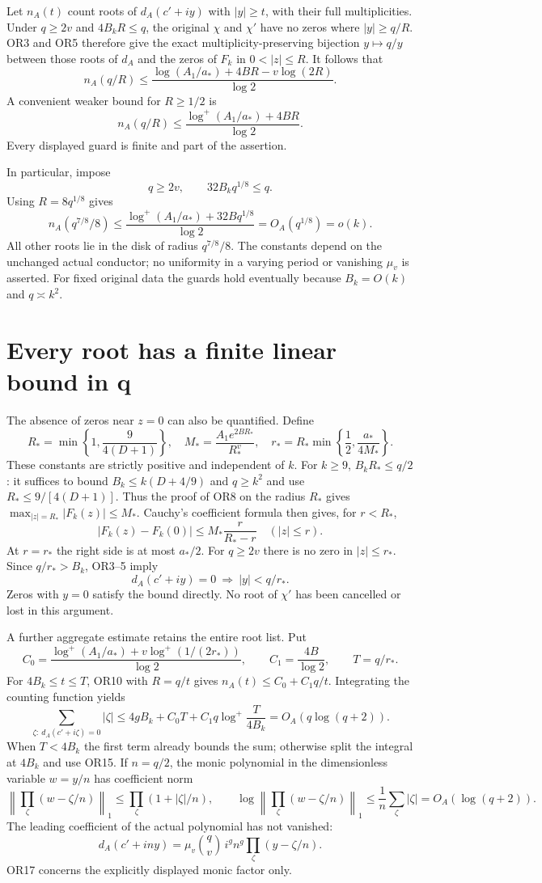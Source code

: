 \documentclass[11pt]{article}
\providecommand{\lp}{\log^+}\providecommand{\norm}[1]{\lVert#1\rVert}
\begin{document}
Let $n_A(t)$ count roots of $d_A(c'+iy)$ with $|y|\ge t$,
with their full multiplicities. Under $q\ge2v$ and $4B_kR\le q$,
the original $\chi$ and $\chi'$ have no zeros where $|y|\ge q/R$.
OR3 and OR5 therefore give the exact multiplicity-preserving
bijection $y\mapsto q/y$ between those roots of $d_A$ and the
zeros of $F_k$ in $0<|z|\le R$. It follows that
\[
n_A(q/R)\le
\frac{\log(A_1/a_*)+4BR-v\log(2R)}{\log2}.
\tag{OR10}
\]
A convenient weaker bound for $R\ge1/2$ is
\[
n_A(q/R)\le
\frac{\lp(A_1/a_*)+4BR}{\log2}.
\tag{OR11}
\]
Every displayed guard is finite and part of the assertion.

In particular, impose
\[
q\ge2v,\qquad 32B_kq^{1/8}\le q.
\tag{OR12}
\]
Using $R=8q^{1/8}$ gives
\[
\boxed{n_A(q^{7/8}/8)\le
\frac{\lp(A_1/a_*)+32Bq^{1/8}}{\log2}
=O_A(q^{1/8})=o(k).}
\tag{OR13}
\]
All other roots lie in the disk of radius $q^{7/8}/8$.
The constants depend on the unchanged actual conductor; no
uniformity in a varying period or vanishing $\mu_v$ is asserted.
For fixed original data the guards hold eventually because
$B_k=O(k)$ and $q\asymp k^2$.

\section{Every root has a finite linear bound in q}
The absence of zeros near $z=0$ can also be quantified. Define
\[
R_*=\min\left\{1,\frac{9}{4(D+1)}\right\},\quad
M_*=\frac{A_1e^{2BR_*}}{R_*^v},\quad
r_* = R_*\min\left\{\frac12,\frac{a_*}{4M_*}\right\}.
\tag{OR14}
\]
These constants are strictly positive and independent of $k$.
For $k\ge9$, $B_kR_*\le q/2$: it suffices to bound
$B_k\le k(D+4/9)$ and $q\ge k^2$ and use
$R_*\le9/[4(D+1)]$.
Thus the proof of OR8 on the radius $R_*$ gives
$\max_{|z|=R_*}|F_k(z)|\le M_*$.
Cauchy's coefficient formula then gives, for $r<R_*$,
\[
|F_k(z)-F_k(0)|\le M_*\frac{r}{R_*-r}
\quad(|z|\le r).
\]
At $r=r_*$ the right side is at most $a_*/2$.
For $q\ge2v$ there is no zero in $|z|\le r_*$.
Since $q/r_*>B_k$, OR3--5 imply
\[
\boxed{d_A(c'+iy)=0\ \Longrightarrow\ |y|<q/r_*.}
\tag{OR15}
\]
Zeros with $y=0$ satisfy the bound directly. No root of $\chi'$
has been cancelled or lost in this argument.

A further aggregate estimate retains the entire root list. Put
\[
C_0=\frac{\lp(A_1/a_*)+v\lp(1/(2r_*))}{\log2},\qquad
C_1=\frac{4B}{\log2},\qquad T=q/r_*.
\]
For $4B_k\le t\le T$, OR10 with $R=q/t$ gives
$n_A(t)\le C_0+C_1q/t$. Integrating the counting function yields
\[
\boxed{\sum_{\zeta:\ d_A(c'+i\zeta)=0}|\zeta|
\le 4gB_k+C_0T+C_1q\lp\frac{T}{4B_k}
=O_A(q\log(q+2)).}
\tag{OR16}
\]
When $T<4B_k$ the first term already bounds the sum; otherwise split
the integral at $4B_k$ and use OR15. If $n=q/2$, the monic polynomial
in the dimensionless variable $w=y/n$ has coefficient norm
\[
\left\|\prod_\zeta(w-\zeta/n)\right\|_1
\le\prod_\zeta(1+|\zeta|/n),\qquad
\log\left\|\prod_\zeta(w-\zeta/n)\right\|_1
\le\frac1n\sum_\zeta|\zeta|=O_A(\log(q+2)).
\tag{OR17}
\]
The leading coefficient of the actual polynomial has not vanished:
\[
d_A(c'+iny)=\mu_v\binom qv\,i^g n^g
                 \prod_\zeta(y-\zeta/n).
\]
OR17 concerns the explicitly displayed monic factor only.
\end{document}
